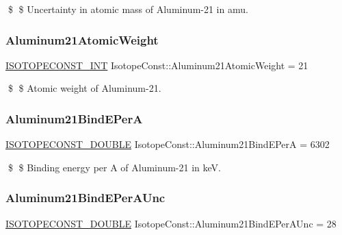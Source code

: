 \$ \$ Uncertainty in atomic mass of Aluminum-\/21 in amu. \mbox{\label{group___isotope_const-_aluminum-_al21_ga929f867586a04e72e4eb4ae2742b1f2c}} 
\subsubsection{\texorpdfstring{Aluminum21\+Atomic\+Weight}{Aluminum21AtomicWeight}}
{\footnotesize\ttfamily \mbox{\hyperlink{group___isotope_const-_macros_ga5f18360b3e99483a35c32d789e62621c}{I\+S\+O\+T\+O\+P\+E\+C\+O\+N\+S\+T\+\_\+\+I\+NT}} Isotope\+Const\+::\+Aluminum21\+Atomic\+Weight = 21}

\$ \$ Atomic weight of Aluminum-\/21. \mbox{\label{group___isotope_const-_aluminum-_al21_gabbaa49da3ad51dbfcd8b07d1d32f43d6}} 
\subsubsection{\texorpdfstring{Aluminum21\+Bind\+E\+PerA}{Aluminum21BindEPerA}}
{\footnotesize\ttfamily \mbox{\hyperlink{group___isotope_const-_macros_ga8f45a7272ce02c0b4c65c44636ed719a}{I\+S\+O\+T\+O\+P\+E\+C\+O\+N\+S\+T\+\_\+\+D\+O\+U\+B\+LE}} Isotope\+Const\+::\+Aluminum21\+Bind\+E\+PerA = 6302}

\$ \$ Binding energy per A of Aluminum-\/21 in keV. \mbox{\label{group___isotope_const-_aluminum-_al21_gadd2a625896fecdc24a2acd645383a5ce}} 
\subsubsection{\texorpdfstring{Aluminum21\+Bind\+E\+Per\+A\+Unc}{Aluminum21BindEPerAUnc}}
{\footnotesize\ttfamily \mbox{\hyperlink{group___isotope_const-_macros_ga8f45a7272ce02c0b4c65c44636ed719a}{I\+S\+O\+T\+O\+P\+E\+C\+O\+N\+S\+T\+\_\+\+D\+O\+U\+B\+LE}} Isotope\+Const\+::\+Aluminum21\+Bind\+E\+Per\+A\+Unc = 28}

